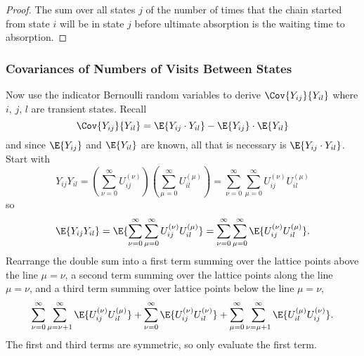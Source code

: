 \documentclass[12pt]{article}
\begin{document}
\begin{proof}
    The sum over all states \( j \) of the number of times that the
    chain started from state \( i \) will be in state \( j \) before
    ultimate absorption is the waiting time to absorption.
\end{proof}

\subsubsection*{Covariances of Numbers of Visits Between States }

Now use the indicator Bernoulli random variables to derive \( \Cov{ Y_{ij}
}{ Y_{il} } \) where \( i \), \( j \), \( l \) are transient states.
Recall
\[
    \Cov{ Y_{ij} }{ Y_{il} } = \E{Y_{ij} \cdot Y_{il}} - \E{Y_{ij}}
    \cdot \E{Y_{il}}
\] and since \( \E{Y_{ij}} \) and \( \E{Y_{il}} \) are known, all that
is necessary is \( \E{Y_{ij} \cdot Y_{il}} \).  Start with
\[
    Y_{ij} Y_{il} = \left( \sum\limits_{\nu=0}^{\infty} U_{ij}^{(\nu)}
    \right) \left( \sum\limits_{\mu=0}^{\infty} U_{il}^{(\mu)} \right) =
    \sum\limits_{\nu=0}^{\infty} \sum\limits_{\mu=0}^{\infty} U_{ij}^{(\nu)}
    U_ {il}^{(\mu)}
\] so
\[
    \E{Y_{ij} Y_{il}} = \E{\sum\limits_{\nu=0}^{\infty} \sum\limits_{\mu=0}^
    {\infty} U_{ij}^{(\nu)} U_{il}^{(\mu)}} = \sum\limits_{\nu=0}^{\infty}
    \sum\limits_{\mu=0}^{\infty} \E{U_{ij}^{(\nu)} U_{il}^{(\mu)}}.
\] Rearrange the double sum into a first term summing over the lattice
points above the line \( \mu=\nu \), a second term summing over the
lattice points along the line \( \mu=\nu \), and a third term summing
over lattice points below the line \( \mu=\nu \),
\[
    \sum\limits_{\nu=0}^{\infty} \sum\limits_{\mu=\nu+1}^{\infty} \E{U_{ij}^
    {(\nu)} U_{il}^{(\mu)}} + \sum\limits_{\nu=0}^{\infty} \E{U_{ij}^{(\nu)}
    U_{il}^{(\nu)}} + \sum\limits_{\mu=0}^{\infty} \sum\limits_{\nu=\mu+1}^
    {\infty} \E{U_{il}^ {(\mu)} U_{ij}^{(\nu)}}.
\] The first and third terms are symmetric, so only evaluate the first
term.
\end{document}

